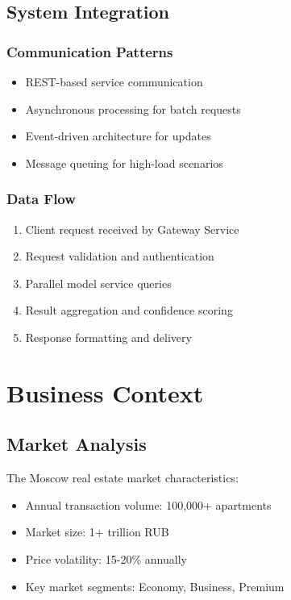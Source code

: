 \documentclass[12pt,a4paper]{report}
\begin{document}
\subsection{System Integration}
\subsubsection{Communication Patterns}
\begin{itemize}
    \item REST-based service communication
    \item Asynchronous processing for batch requests
    \item Event-driven architecture for updates
    \item Message queuing for high-load scenarios
\end{itemize}

\subsubsection{Data Flow}
\begin{enumerate}
    \item Client request received by Gateway Service
    \item Request validation and authentication
    \item Parallel model service queries
    \item Result aggregation and confidence scoring
    \item Response formatting and delivery
\end{enumerate}

\section{Business Context}
\subsection{Market Analysis}
The Moscow real estate market characteristics:
\begin{itemize}
    \item Annual transaction volume: 100,000+ apartments
    \item Market size: 1+ trillion RUB
    \item Price volatility: 15-20\% annually
    \item Key market segments: Economy, Business, Premium
\end{itemize}
\end{document}
